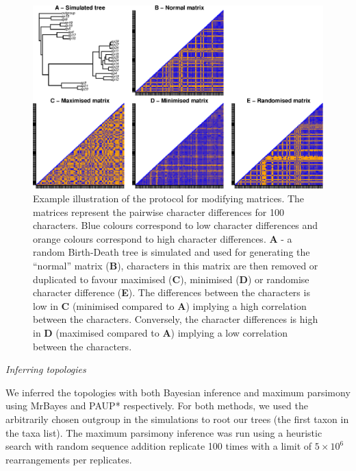 \documentclass[12pt,letterpaper]{article}
\renewcommand{\subsection}[1]{%
\bigskip
\begin{center}
\begin{large}
\normalfont\itshape #1
\end{large}
\end{center}}
\begin{document}
\begin{figure}[!htbp]
\centering
   \includegraphics[width=1\textwidth]{Modif_matrix.eps}
\caption{Example illustration of the protocol for modifying matrices. The matrices represent the pairwise character differences for 100 characters. Blue colours correspond to low character differences and orange colours correspond to high character differences. \textbf{A} - a random Birth-Death tree is simulated and used for generating the ``normal'' matrix (\textbf{B}), characters in this matrix are then removed or duplicated to favour maximised (\textbf{C}), minimised (\textbf{D}) or randomise character difference (\textbf{E}). The differences between the characters is low in \textbf{C} (minimised compared to \textbf{A}) implying a high correlation between the characters. Conversely, the character differences is high in \textbf{D} (maximised compared to \textbf{A}) implying a low correlation between the characters.}
\label{Fig:modif_matrix}
\end{figure}

\subsection{Inferring topologies}
We inferred the topologies with both Bayesian inference and maximum parsimony using MrBayes \citep[v3.2.6;][]{Ronquist2012mrbayes} and PAUP* \citep[v4.0a151;][]{swofford2001paup} respectively.
For both methods, we used the arbitrarily chosen outgroup in the simulations to root our trees (the first taxon in the taxa list).
The maximum parsimony inference was run using a heuristic search with random sequence addition replicate 100 times with a limit of $5\times10^6$ rearrangements per replicates.
\end{document}
